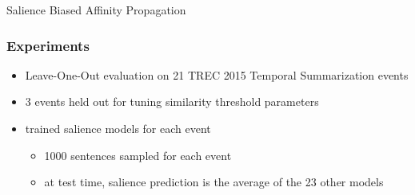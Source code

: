 \begin{frame}{Salience Biased Affinity Propagation}

\end{frame}

\begin{frame}
    \frametitle{Experiments}
    
    \begin{itemize}
        \pause
    \item Leave-One-Out evaluation on 21 TREC 2015 Temporal Summarization events
        \pause
        \item 3 events held out for tuning similarity threshold parameters
        \pause
        \item trained salience models for each event
        \pause
        \begin{itemize}
            \item 1000 sentences sampled for each event
            \item at test time, salience prediction is the average of the 
                23 other models
        \end{itemize}
    \end{itemize}
    
\end{frame}

